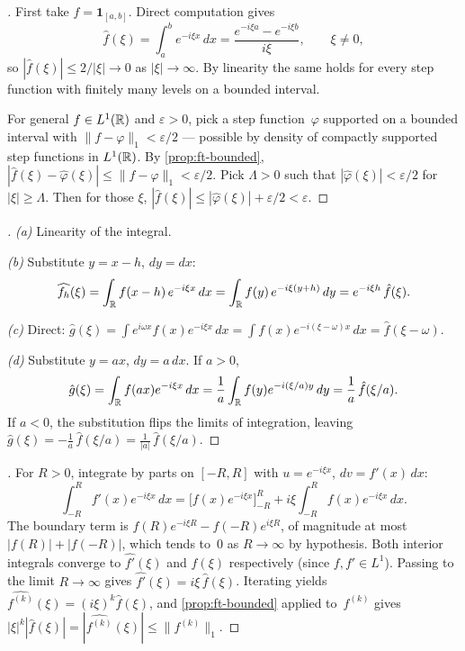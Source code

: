 \begin{proof}[]
First take $f = \mathbf{1}_{[a, b]}$. Direct computation gives
\[
  \hat f(\xi) = \int_a^b e^{-i \xi x}\, dx = \frac{e^{-i \xi a} - e^{-i \xi b}}{i \xi}, \qquad \xi \neq 0,
\]
so $|\hat f(\xi)| \leq 2/|\xi| \to 0$ as $|\xi| \to \infty$. By
linearity the same holds for every step function with finitely many
levels on a bounded interval.

For general $f \in L^1(\mathbb{R})$ and $\varepsilon > 0$, pick a step
function~$\varphi$ supported on a bounded interval with
$\|f - \varphi\|_1 < \varepsilon/2$ — possible by density of
compactly supported step functions in $L^1(\mathbb{R})$. By
\cref{prop:ft-bounded},
$|\hat f(\xi) - \hat \varphi(\xi)| \leq \|f - \varphi\|_1 < \varepsilon/2$.
Pick $\Lambda > 0$ such that $|\hat \varphi(\xi)| < \varepsilon/2$
for $|\xi| \geq \Lambda$. Then for those $\xi$,
$|\hat f(\xi)| \leq |\hat \varphi(\xi)| + \varepsilon/2 < \varepsilon$.
\end{proof}

\begin{proof}[]
\emph{(a)} Linearity of the integral.

\emph{(b)} Substitute $y = x - h$, $dy = dx$:
\[
  \widehat{f_h}(\xi) = \int_{\mathbb{R}} f(x - h)\, e^{-i \xi x}\, dx
                     = \int_{\mathbb{R}} f(y)\, e^{-i \xi (y + h)}\, dy
                     = e^{-i \xi h}\, \hat f(\xi).
\]

\emph{(c)} Direct: $\hat g(\xi) = \int e^{i \omega x} f(x) e^{-i \xi x}\, dx
= \int f(x) e^{-i (\xi - \omega) x}\, dx = \hat f(\xi - \omega)$.

\emph{(d)} Substitute $y = a x$, $dy = a\, dx$. If $a > 0$,
\[
  \hat g(\xi) = \int_{\mathbb{R}} f(a x) e^{-i \xi x}\, dx
              = \frac{1}{a} \int_{\mathbb{R}} f(y) e^{-i (\xi/a) y}\, dy
              = \frac{1}{a}\, \hat f(\xi/a).
\]
If $a < 0$, the substitution flips the limits of integration, leaving
$\hat g(\xi) = -\tfrac{1}{a}\, \hat f(\xi/a) = \tfrac{1}{|a|}\, \hat f(\xi/a)$.
\end{proof}

\begin{proof}[]
For $R > 0$, integrate by parts on $[-R, R]$ with $u = e^{-i\xi x}$,
$dv = f'(x)\, dx$:
\[
  \int_{-R}^{R} f'(x) e^{-i\xi x}\, dx
  = \bigl[f(x) e^{-i\xi x}\bigr]_{-R}^{R}
    + i\xi \int_{-R}^{R} f(x) e^{-i\xi x}\, dx.
\]
The boundary term is $f(R) e^{-i\xi R} - f(-R) e^{i\xi R}$, of
magnitude at most $|f(R)| + |f(-R)|$, which tends to~$0$ as
$R \to \infty$ by hypothesis. Both interior integrals converge to
$\widehat{f'}(\xi)$ and $\hat f(\xi)$ respectively (since $f, f' \in L^1$).
Passing to the limit $R \to \infty$ gives
$\widehat{f'}(\xi) = i\xi\, \hat f(\xi)$. Iterating yields
$\widehat{f^{(k)}}(\xi) = (i\xi)^k \hat f(\xi)$, and
\cref{prop:ft-bounded} applied to~$f^{(k)}$ gives
$|\xi|^k |\hat f(\xi)| = |\widehat{f^{(k)}}(\xi)| \leq \|f^{(k)}\|_1$.
\end{proof}

